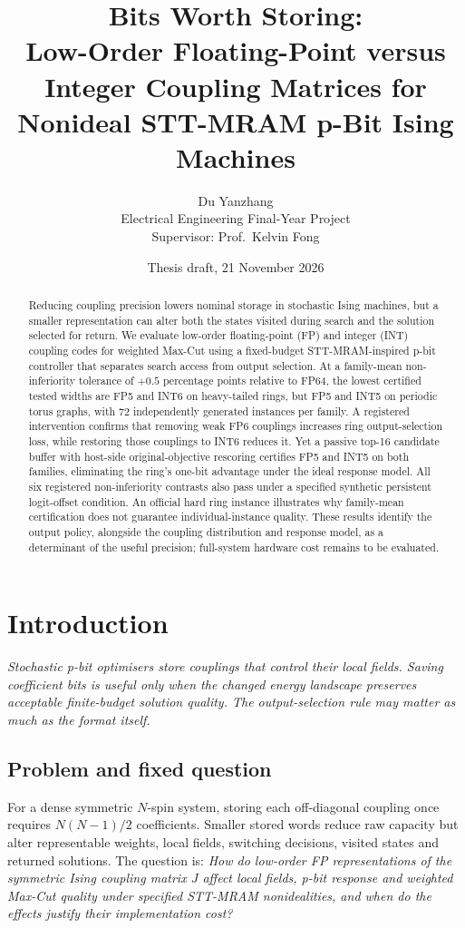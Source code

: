 \documentclass[11pt,a4paper,oneside]{report}
\title{\vspace{-1em}\bfseries Bits Worth Storing:\\ Low-Order Floating-Point versus Integer Coupling Matrices for Nonideal STT-MRAM p-Bit Ising Machines}
\author{Du Yanzhang\\Electrical Engineering Final-Year Project\\Supervisor: Prof.\ Kelvin Fong}
\date{Thesis draft, 21 November 2026}
\begin{document}
\maketitle
\begin{abstract}
Reducing coupling precision lowers nominal storage in stochastic Ising
machines, but a smaller representation can alter both the states visited
during search and the solution selected for return. We evaluate low-order
floating-point (FP) and integer (INT) coupling codes for weighted Max-Cut
using a fixed-budget STT-MRAM-inspired p-bit controller that separates
search access from output selection. At a family-mean non-inferiority
tolerance of $+0.5$ percentage points relative to FP64, the lowest
certified tested widths are FP5 and INT6 on heavy-tailed rings, but FP5
and INT5 on periodic torus graphs, with 72 independently generated
instances per family. A registered intervention confirms that removing
weak FP6 couplings increases ring output-selection loss, while restoring
those couplings to INT6 reduces it. Yet a passive top-16 candidate
buffer with host-side original-objective rescoring certifies FP5 and
INT5 on both families, eliminating the ring's one-bit advantage under
the ideal response model. All six registered non-inferiority contrasts
also pass under a specified synthetic persistent logit-offset condition.
An official hard ring instance illustrates why family-mean certification
does not guarantee individual-instance quality. These results identify
the output policy, alongside the coupling distribution and response
model, as a determinant of the useful precision; full-system hardware
cost remains to be evaluated.
\end{abstract}
\tableofcontents

\chapter{Introduction}
\noindent\emph{Stochastic p-bit optimisers store couplings that control their
local fields. Saving coefficient bits is useful only when the changed
energy landscape preserves acceptable finite-budget solution quality.
The output-selection rule may matter as much as the format itself.}

\section{Problem and fixed question}
For a dense symmetric $N$-spin system, storing each off-diagonal
coupling once requires $N(N-1)/2$ coefficients. Smaller stored words
reduce raw capacity but alter representable weights, local fields,
switching decisions, visited states and returned solutions. The
question is: \emph{How do low-order FP representations of the symmetric
Ising coupling matrix $J$ affect local fields, p-bit response and
weighted Max-Cut quality under specified STT-MRAM nonidealities,
and when do the effects justify their implementation cost?}
\end{document}
